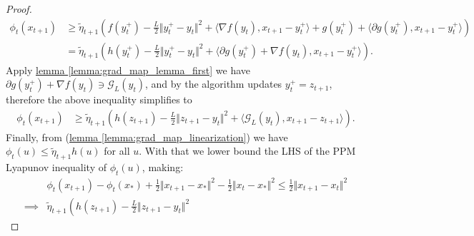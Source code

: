 \documentclass[12pt]{article}
\begin{document}
\begin{proof}
            {\small
                \begin{align*}
                    \phi_t(x_{t + 1})
                    &\ge 
                    \tilde\eta_{t + 1}
                    \left(
                        f(y_t^+) - \frac{L}{2}\Vert y_t^+ - y_t\Vert^2 
                        +
                        \langle \nabla f(y_t), x_{t + 1} - y_t^+\rangle
                        + 
                        g(y_t^+) + 
                        \langle \partial g(y_t^+), x_{t + 1} - y_t^+\rangle
                    \right) 
                    \\
                    &= 
                    \tilde\eta_{t + 1}
                    \left(
                        h(y_t^+) - \frac{L}{2}\Vert y_t^+ - y_t\Vert^2 
                        + 
                        \langle \partial g(y_t^+) + \nabla f(y_t), x_{t + 1} - y_t^+\rangle
                    \right).
                \end{align*}
            }
            Apply
            \hyperref[lemma:grad_map_lemma_first]{lemma \ref*{lemma:grad_map_lemma_first}} 
            we have $\partial g(y_t^+) + \nabla f(y_t) \ni \mathcal G_L(y_t)$, and by the algorithm updates $y_t^+ = z_{t + 1}$, therefore the above inequality simplifies to 
            \begin{align*}
                \phi_t(x_{t + 1}) &\ge 
                \tilde\eta_{t + 1} 
                \left(
                    h(z_{t + 1}) - 
                    \frac{L}{2}\Vert z_{t + 1} - y_t\Vert^2
                    + 
                    \langle \mathcal G_L(y_t), x_{t +1} - z_{t + 1}\rangle
                \right). 
            \end{align*}
            Finally, from (\hyperref[lemma:grad_map_linearization]
                {lemma \ref*{lemma:grad_map_linearization}})
            we have $\phi_t(u) \le \tilde\eta_{t + 1}h(u)$ for all $u$. 
            With that we lower bound the LHS of the PPM Lyapunov inequality of $\phi_t(u)$, making: 
            {\footnotesize
            \begin{align*}
                & \phi_t(x_{t + 1}) - \phi_t(x_*) + 
                \frac{1}{2}\Vert x_{t+1} - x_*\Vert^2 - 
                \frac{1}{2}\Vert x_t - x_*\Vert^2
                \le
                \frac{1}{2}\Vert x_{t + 1} - x_t\Vert^2 
                \\
                \implies &
                \tilde \eta_{t + 1}
                \left(
                    h(z_{t + 1}) - 
                    \frac{L}{2}\Vert z_{t + 1} - y_t\Vert^2

\end{align*}}
\end{proof}
\end{document}
